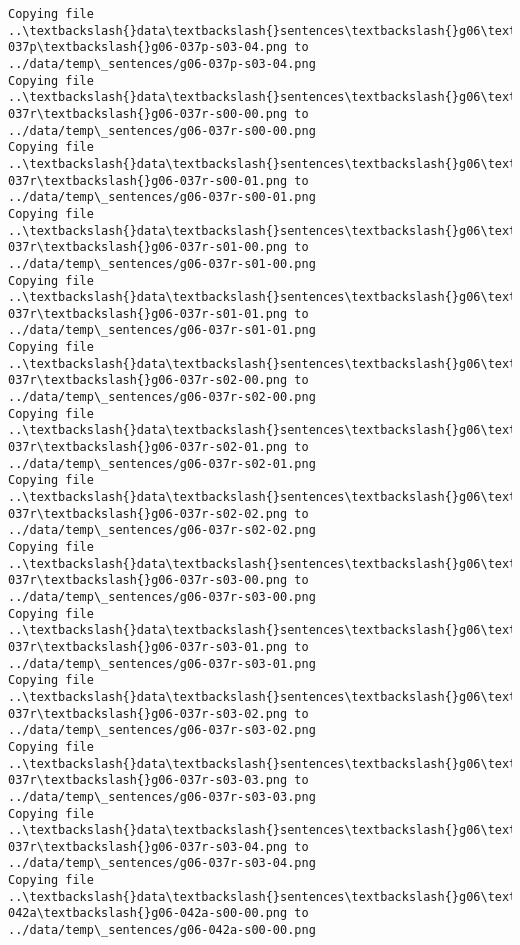\documentclass[11pt]{article}
\begin{document}
\begin{Verbatim}[commandchars=\\\{\}]
Copying file ..\textbackslash{}data\textbackslash{}sentences\textbackslash{}g06\textbackslash{}g06-037p\textbackslash{}g06-037p-s03-04.png to
../data/temp\_sentences/g06-037p-s03-04.png
Copying file ..\textbackslash{}data\textbackslash{}sentences\textbackslash{}g06\textbackslash{}g06-037r\textbackslash{}g06-037r-s00-00.png to
../data/temp\_sentences/g06-037r-s00-00.png
Copying file ..\textbackslash{}data\textbackslash{}sentences\textbackslash{}g06\textbackslash{}g06-037r\textbackslash{}g06-037r-s00-01.png to
../data/temp\_sentences/g06-037r-s00-01.png
Copying file ..\textbackslash{}data\textbackslash{}sentences\textbackslash{}g06\textbackslash{}g06-037r\textbackslash{}g06-037r-s01-00.png to
../data/temp\_sentences/g06-037r-s01-00.png
Copying file ..\textbackslash{}data\textbackslash{}sentences\textbackslash{}g06\textbackslash{}g06-037r\textbackslash{}g06-037r-s01-01.png to
../data/temp\_sentences/g06-037r-s01-01.png
Copying file ..\textbackslash{}data\textbackslash{}sentences\textbackslash{}g06\textbackslash{}g06-037r\textbackslash{}g06-037r-s02-00.png to
../data/temp\_sentences/g06-037r-s02-00.png
Copying file ..\textbackslash{}data\textbackslash{}sentences\textbackslash{}g06\textbackslash{}g06-037r\textbackslash{}g06-037r-s02-01.png to
../data/temp\_sentences/g06-037r-s02-01.png
Copying file ..\textbackslash{}data\textbackslash{}sentences\textbackslash{}g06\textbackslash{}g06-037r\textbackslash{}g06-037r-s02-02.png to
../data/temp\_sentences/g06-037r-s02-02.png
Copying file ..\textbackslash{}data\textbackslash{}sentences\textbackslash{}g06\textbackslash{}g06-037r\textbackslash{}g06-037r-s03-00.png to
../data/temp\_sentences/g06-037r-s03-00.png
Copying file ..\textbackslash{}data\textbackslash{}sentences\textbackslash{}g06\textbackslash{}g06-037r\textbackslash{}g06-037r-s03-01.png to
../data/temp\_sentences/g06-037r-s03-01.png
Copying file ..\textbackslash{}data\textbackslash{}sentences\textbackslash{}g06\textbackslash{}g06-037r\textbackslash{}g06-037r-s03-02.png to
../data/temp\_sentences/g06-037r-s03-02.png
Copying file ..\textbackslash{}data\textbackslash{}sentences\textbackslash{}g06\textbackslash{}g06-037r\textbackslash{}g06-037r-s03-03.png to
../data/temp\_sentences/g06-037r-s03-03.png
Copying file ..\textbackslash{}data\textbackslash{}sentences\textbackslash{}g06\textbackslash{}g06-037r\textbackslash{}g06-037r-s03-04.png to
../data/temp\_sentences/g06-037r-s03-04.png
Copying file ..\textbackslash{}data\textbackslash{}sentences\textbackslash{}g06\textbackslash{}g06-042a\textbackslash{}g06-042a-s00-00.png to
../data/temp\_sentences/g06-042a-s00-00.png

\end{Verbatim}
\end{document}
